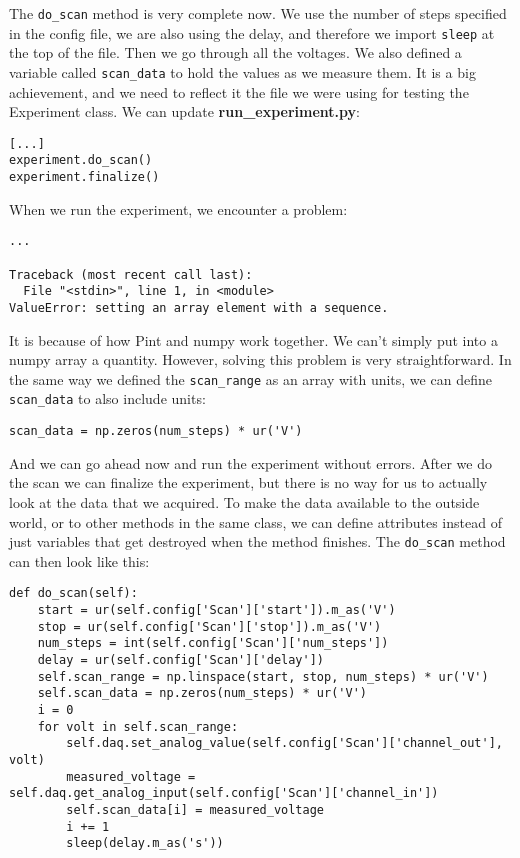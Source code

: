 The \texttt{do\_scan} method is very complete now. We use the number of steps specified in the config file, we are also using the delay, and therefore we import \texttt{sleep} at the top of the file. Then we go through all the voltages. We also defined a variable called \texttt{scan\_data} to hold the values as we measure them. It is a big achievement, and we need to reflect it the file we were using for testing the Experiment class. We can update \textbf{run\_experiment.py}:

\begin{verbatim}
[...]
experiment.do_scan()
experiment.finalize()
\end{verbatim}

When we run the experiment, we encounter a problem:

\begin{verbatim}
...

Traceback (most recent call last):
  File "<stdin>", line 1, in <module>
ValueError: setting an array element with a sequence.
\end{verbatim}

It is because of how Pint and numpy work together. We can't simply put into a numpy array a quantity. However, solving this problem is very straightforward. In the same way we defined the \texttt{scan\_range} as an array with units, we can define \texttt{scan\_data} to also include units:

\begin{verbatim}
scan_data = np.zeros(num_steps) * ur('V')
\end{verbatim}

And we can go ahead now and run the experiment without errors. After we do the scan we can finalize the experiment, but there is no way for us to actually look at the data that we acquired. To make the data available to the outside world, or to other methods in the same class, we can define attributes instead of just variables that get destroyed when the method finishes. The \texttt{do\_scan} method can then look like this:

\begin{verbatim}
def do_scan(self):
    start = ur(self.config['Scan']['start']).m_as('V')
    stop = ur(self.config['Scan']['stop']).m_as('V')
    num_steps = int(self.config['Scan']['num_steps'])
    delay = ur(self.config['Scan']['delay'])
    self.scan_range = np.linspace(start, stop, num_steps) * ur('V')
    self.scan_data = np.zeros(num_steps) * ur('V')
    i = 0
    for volt in self.scan_range:
        self.daq.set_analog_value(self.config['Scan']['channel_out'], volt)
        measured_voltage = self.daq.get_analog_input(self.config['Scan']['channel_in'])
        self.scan_data[i] = measured_voltage
        i += 1
        sleep(delay.m_as('s'))
\end{verbatim}


